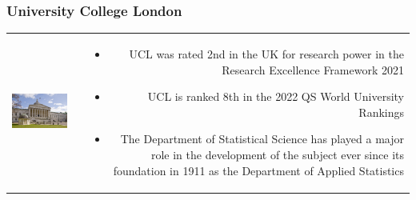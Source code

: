 
\begin{frame}
\frametitle{University College London}
\begin{tabular}{lcr}
\begin{minipage}[l]{5.0cm}
\includegraphics[height=3.8cm]{ucl_building}
\end{minipage} & &
\begin{minipage}[r]{6.5cm}
\begin{itemize}
\item UCL was rated 2nd in the UK for research power in the Research Excellence Framework 2021
\item UCL is ranked 8th in the 2022 QS World University Rankings
\item The Department of Statistical Science has played a major role in the development of the subject ever since its foundation in 1911 as the Department of Applied Statistics
\end{itemize}
\end{minipage}
\end{tabular}
\end{frame}


